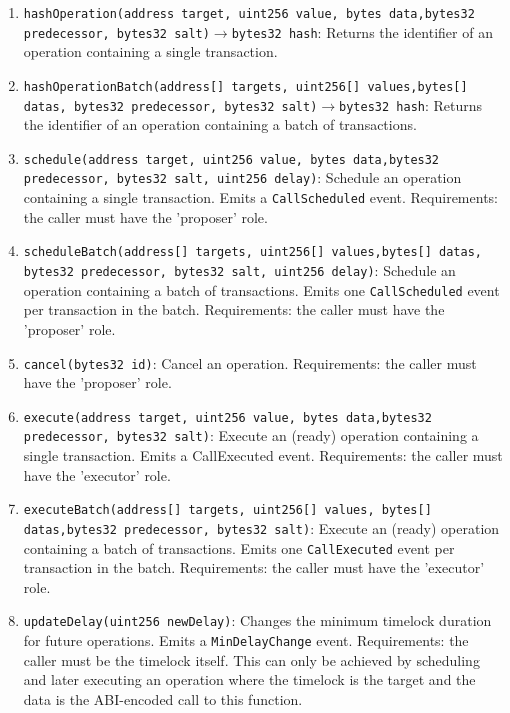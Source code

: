 \begin{enumerate}
\begin{enumerate}
	\item\verb|hashOperation(address target, uint256 value, bytes data,|\linebreak\verb|bytes32 predecessor, bytes32 salt)|$\rightarrow$\verb|bytes32 hash|: Returns the identifier of an operation containing a single transaction.
	\item\verb|hashOperationBatch(address[] targets, uint256[] values,|\linebreak\verb|bytes[] datas, bytes32 predecessor, bytes32 salt)|$\rightarrow$\verb|bytes32 hash|: Returns the identifier of an operation containing a batch of transactions.
	\item\verb|schedule(address target, uint256 value, bytes data,|\linebreak\verb|bytes32 predecessor, bytes32 salt, uint256 delay)|: Schedule an operation containing a single transaction. Emits a \verb|CallScheduled| event. Requirements: the caller must have the 'proposer' role.
	\item\verb|scheduleBatch(address[] targets, uint256[] values,|\linebreak\verb|bytes[] datas, bytes32 predecessor, bytes32 salt, uint256 delay)|: Schedule an operation containing a batch of transactions. Emits one \verb|CallScheduled| event per transaction in the batch. Requirements: the caller must have the 'proposer' role.
	\item\verb|cancel(bytes32 id)|: Cancel an operation. Requirements: the caller must have the 'proposer' role.
	\item\verb|execute(address target, uint256 value, bytes data,|\linebreak\verb|bytes32 predecessor, bytes32 salt)|: Execute an (ready) operation containing a single transaction. Emits a CallExecuted event. Requirements: the caller must have the 'executor' role.
	\item\verb|executeBatch(address[] targets, uint256[] values, bytes[] datas,|\linebreak\verb|bytes32 predecessor, bytes32 salt)|: Execute an (ready) operation containing a batch of transactions. Emits one \verb|CallExecuted| event per transaction in the batch. Requirements: the caller must have the 'executor' role.
	\item\verb|updateDelay(uint256 newDelay)|: Changes the minimum timelock duration for future operations. Emits a \verb|MinDelayChange| event. Requirements: the caller must be the timelock itself. This can only be achieved by scheduling and later executing an operation where the timelock is the target and the data is the ABI-encoded call to this function.
	\end{enumerate}


\end{enumerate}
